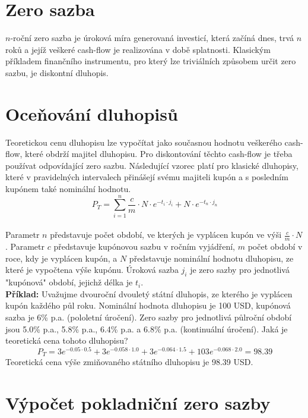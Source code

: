 \documentclass[a4paper]{book}
\begin{document}
\section{Zero sazba}

$n$-roční zero sazba je úroková míra generovaná investicí, která začíná dnes, trvá $n$ roků a jejíž veškeré cash-flow je realizována v době splatnosti. Klasickým příkladem finančního instrumentu, pro který lze triviálních způsobem určit zero sazbu, je diskontní dluhopis.

\section{Oceňování dluhopisů}

Teoretickou cenu dluhopisu lze vypočítat jako současnou hodnotu veškerého cash-flow, které obdrží majitel dluhopisu. Pro diskontování těchto cash-flow je třeba používat odpovídající zero sazbu.
Následující vzorec platí pro klasické dluhopisy, které v pravidelných intervalech přinášejí svému majiteli kupón a s posledním kupónem také nominální hodnotu.
\begin{equation*}
P_T = \sum_{i=1}^n \frac{c}{m} \cdot N \cdot e^{-t_i \cdot j_i} + N \cdot e^{-t_n \cdot j_n}
\end{equation*}\\
Parametr $n$ představuje počet období, ve kterých je vyplácen kupón ve výši $\frac{c}{m} \cdot N$. Parametr $c$ představuje kupónovou sazbu v ročním vyjádření, $m$ počet období v roce, kdy je vyplácen kupón, a $N$ představuje nominální hodnotu dluhopisu, ze které je vypočtena výše kupónu. Úroková sazba $j_i$ je zero sazby pro jednotlivá "kupónová" období, jejichž délka je $t_i$.\\

\noindent \textbf{Příklad:} Uvažujme dvouroční dvouletý státní dluhopis, ze kterého je vyplácen kupón každého půl roku. Nominální hodnota dluhopisu je 100 USD, kupónová sazba je 6\% p.a. (pololetní úročení). Zero sazby pro jednotlivá půlroční období jsou 5.0\% p.a., 5.8\% p.a., 6.4\% p.a. a 6.8\% p.a. (kontinuální úročení). Jaká je teoretická cena tohoto dluhopisu?
\begin{equation*}
P_T = 3e^{-0.05 \cdot 0.5} + 3e^{-0.058 \cdot 1.0} + 3e^{-0.064 \cdot 1.5} + 103e^{-0.068 \cdot 2.0} = 98.39
\end{equation*}
Teoretická cena výše zmiňovaného státního dluhopisu je 98.39 USD.

\section{Výpočet pokladniční zero sazby}
\end{document}
